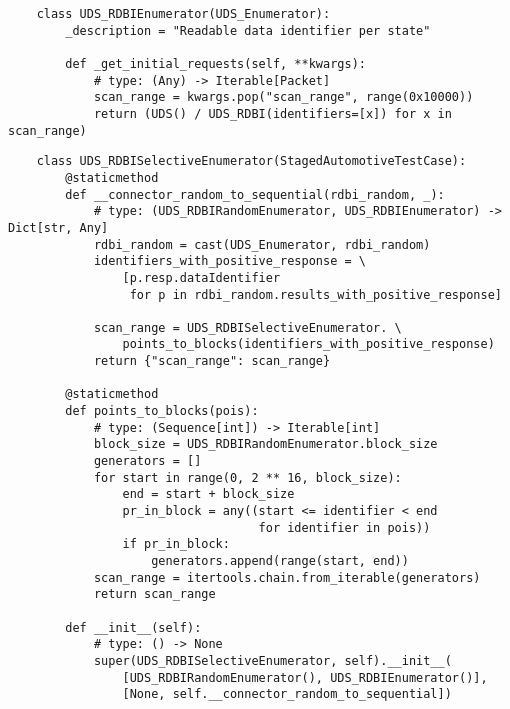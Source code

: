 \begin{verbatim}
    class UDS_RDBIEnumerator(UDS_Enumerator):
        _description = "Readable data identifier per state"

        def _get_initial_requests(self, **kwargs):
            # type: (Any) -> Iterable[Packet]
            scan_range = kwargs.pop("scan_range", range(0x10000))
            return (UDS() / UDS_RDBI(identifiers=[x]) for x in scan_range)
\end{verbatim}
    
\begin{verbatim}
    class UDS_RDBISelectiveEnumerator(StagedAutomotiveTestCase):
        @staticmethod
        def __connector_random_to_sequential(rdbi_random, _):
            # type: (UDS_RDBIRandomEnumerator, UDS_RDBIEnumerator) -> Dict[str, Any]
            rdbi_random = cast(UDS_Enumerator, rdbi_random)
            identifiers_with_positive_response = \
                [p.resp.dataIdentifier
                 for p in rdbi_random.results_with_positive_response]
    
            scan_range = UDS_RDBISelectiveEnumerator. \
                points_to_blocks(identifiers_with_positive_response)
            return {"scan_range": scan_range}
    
        @staticmethod
        def points_to_blocks(pois):
            # type: (Sequence[int]) -> Iterable[int]
            block_size = UDS_RDBIRandomEnumerator.block_size
            generators = []
            for start in range(0, 2 ** 16, block_size):
                end = start + block_size
                pr_in_block = any((start <= identifier < end
                                   for identifier in pois))
                if pr_in_block:
                    generators.append(range(start, end))
            scan_range = itertools.chain.from_iterable(generators)
            return scan_range
    
        def __init__(self):
            # type: () -> None
            super(UDS_RDBISelectiveEnumerator, self).__init__(
                [UDS_RDBIRandomEnumerator(), UDS_RDBIEnumerator()],
                [None, self.__connector_random_to_sequential])
\end{verbatim}


